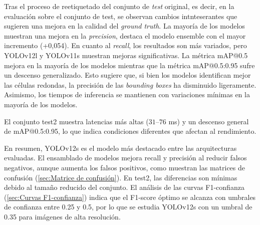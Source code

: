 \documentclass[12pt,a4paper,onecolumn,oneside]{report}
\begin{document}
Tras el proceso de reetiquetado del conjunto de \textit{test} original, es decir, en la evaluación sobre el conjunto de test, se observan cambios intnteserantes que 
sugieren una mejora en la calidad del \textit{ground truth}. La mayoría de los modelos muestran una mejora en la \textit{precision}, destaca el modelo ensemble con el mayor incremento (+0,054). 
En cuanto al \textit{recall}, los resultados son más variados, pero YOLOv12l y YOLOv11s muestran mejoras significativas.
La métrica mAP@0.5 mejora en la mayoría de los modelos mientras que la métrica mAP@0.5:0.95 sufre un descenso generalizado. Esto sugiere que, si bien los modelos identifican mejor las células redondas, la precisión de las \textit{bounding boxes} ha disminuido ligeramente.
Asimismo, los tiempos de inferencia se mantienen con variaciones mínimas en la mayoría de los modelos.

El conjunto test2 muestra latencias más altas ($31$–$76$ ms) y un descenso general de mAP@0.5:0.95, lo que indica condiciones diferentes que afectan al rendimiento.

En resumen, YOLOv12s es el modelo más destacado entre las arquitecturas evaluadas. El ensamblado de modelos mejora recall y precisión al reducir falsos negativos, aunque aumenta los falsos positivos, como muestran las matrices de confusión 
(\autoref{sec:Matrice de confusión}). En test2, las diferencias son mínimas debido al tamaño reducido del conjunto. El análisis de las curvas F1-confianza 
(\autoref{sec:Curvas F1-confianza}) indica que el F1-score óptimo se alcanza con umbrales de confianza entre 0.25 y 0.5, por lo que se estudia YOLOv12s con un umbral de 0.35 
para imágenes de alta resolución.
\end{document}
